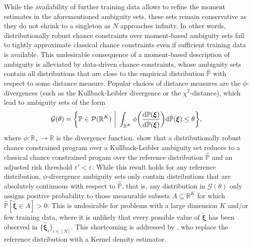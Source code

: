 \documentclass[nonblindrev]{informs2017}
\newcommand{\bmh}[1]{\hat{\bm{#1}}}
\newcommand{\1}[1]{\mathds{1}{\left(#1\right)}}
\begin{document}
While the availability of further training data allows to refine the moment estimates in the aforementioned ambiguity sets, these sets remain conservative as they do not shrink to a singleton as $N$ approaches infinity. In other words, distributionally robust chance constraints over moment-based ambiguity sets fail to tightly approximate classical chance constraints even if sufficient training data is available. This undesirable consequence of a moment-based description of ambiguity is alleviated by data-driven chance constraints, whose ambiguity sets contain all distributions that are close to the empirical distribution $\hat{\mathbb{P}}$ with respect to some distance measure. Popular choices of distance measures are the $\phi$-divergences (such as the Kullback-Leibler divergence or the $\chi^2$-distance), which lead to ambiguity sets of the form
\begin{equation*}
\mathcal{G}(\theta) = \bigg\{\mathbb{P} \in \mathcal{P}(\mathbb{R}^K) ~\bigg|~
\int_{\mathbb{R}^K} \phi\bigg(\dfrac{{\rm d}\mathbb{P}(\bm{\xi})}{{\rm d}\hat{\mathbb{P}}(\bm{\xi})}\bigg){\rm d}\hat{\mathbb{P}}(\bm{\xi}) \leq \theta \bigg.\bigg\},
\end{equation*}
where $\phi: \mathbb{R}_+ \rightarrow \mathbb{R}$ is the divergence function. \cite{Hu_Hong_2013} show that a distributionally robust chance constrained program over a Kullback-Leibler ambiguity set reduces to a classical chance constrained progam over the reference distribution $\hat{\mathbb{P}}$ and an adjusted risk threshold $\varepsilon' < \varepsilon$. While this result holds for any reference distribution, $\phi$-divergence ambiguity sets only contain distributions that are absolutely continuous with respect to $\hat{\mathbb{P}}$, that is, any distribution in $\mathcal{G} (\theta)$ only assigns positive probability to those measurable subsets $A \subseteq \mathbb{R}^K$ for which $\hat{\mathbb{P}} [\tilde{\bm{\xi}} \in A] > 0$. This is undesirable for problems with a large dimension $K$ and/or few training data, where it is unlikely that every possible value of $\tilde{\bm{\xi}}$ has been observed in $\{\bmh{\xi}_i\}_{i \in [N]}$. This shortcoming is addressed by \cite{Jiang_Guan_2016, jiang2015risk}, who replace the reference distribution with a Kernel density estimator.
\end{document}
